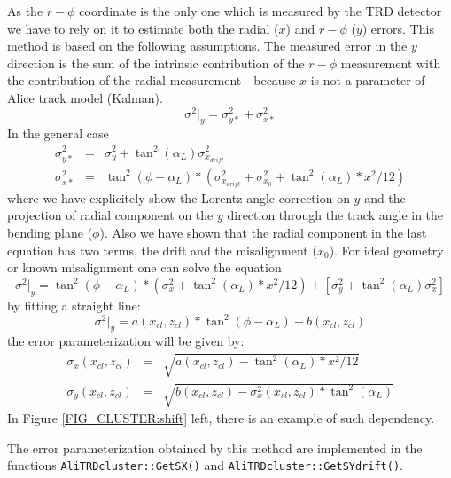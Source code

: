 \documentclass{alicetdr}
\begin{document}
As the $r-\phi$ coordinate is the only one which is measured by the TRD detector we 
have to rely on it to estimate both the radial ($x$) and $r-\phi$ ($y$) errors. This 
method is based on the following assumptions. The measured error in the $y$ 
direction is the sum of the intrinsic contribution of the $r-\phi$ measurement
with the contribution of the radial measurement - because $x$ is not a parameter of 
Alice track model (Kalman).
\begin{equation}
\sigma^{2}|_{y} = \sigma^{2}_{y*} + \sigma^{2}_{x*}   
\end{equation}
In the general case 
\begin{eqnarray}
\sigma^{2}_{y*}& =& \sigma^{2}_{y} + \tan^{2}(\alpha_{L})\sigma^{2}_{x_{drift}}\\   
\sigma^{2}_{x*} &=& \tan^{2}(\phi - \alpha_{L})*(\sigma^{2}_{x_{drift}} 
                 + \sigma^{2}_{x_{0}} + \tan^{2}(\alpha_{L})*x^{2}/12)
\end{eqnarray}
where we have explicitely show the Lorentz angle correction on $y$ and the projection 
of radial component on the $y$ direction through the track angle in the bending plane 
($\phi$). Also we have shown that the radial component in the last equation has two 
terms, the drift and the misalignment ($x_0$). For ideal geometry or known misalignment 
one can solve the equation
\begin{equation}
\sigma^{2}|_{y} = \tan^{2}(\phi - \alpha_{L})*(\sigma^{2}_{x} 
                + \tan^{2}(\alpha_{L})*x^{2}/12)
                + [\sigma^{2}_{y} + \tan^{2}(\alpha_{L})\sigma^{2}_{x}]
\end{equation}
by fitting a straight line:
\begin{equation}
\sigma^{2}|_{y} = a(x_{cl}, z_{cl}) * \tan^{2}(\phi - \alpha_{L}) + b(x_{cl}, z_{cl})
\end{equation}
the error parameterization will be given by:
\begin{eqnarray}
\sigma_{x} (x_{cl}, z_{cl}) &=& \sqrt{a(x_{cl}, z_{cl}) - \tan^{2}(\alpha_{L})*x^{2}/12}\\
\sigma_{y} (x_{cl}, z_{cl}) &=& \sqrt{b(x_{cl}, z_{cl}) - \sigma^{2}_{x} (x_{cl}, z_{cl}) 
                             * \tan^{2}(\alpha_{L})}
\end{eqnarray}
In Figure \ref{FIG_CLUSTER:shift} left, there is an example of such dependency. 

The error parameterization obtained by this method are implemented in the functions 
{\tt AliTRD\-cluster::GetSX()} and {\tt AliTRDcluster::GetSYdrift()}. 
\end{document}
